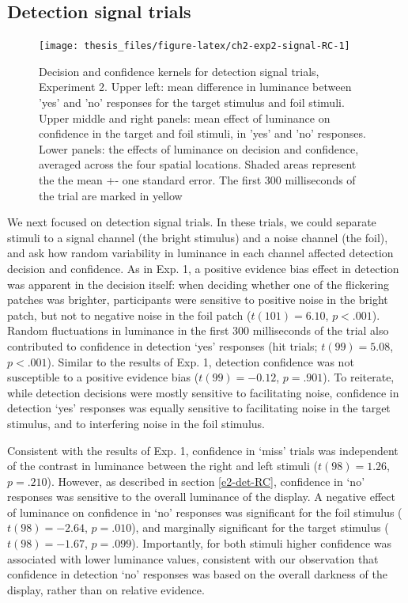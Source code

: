 \documentclass[12pt,twoside]{reedthesis}
\begin{document}
\hypertarget{detection-signal-trials-1}{%
\subsection{Detection signal trials}\label{detection-signal-trials-1}}
\begin{figure}
\texttt{[image: thesis\_files/figure-latex/ch2-exp2-signal-RC-1]} \caption[Decision kernels in detection signal trials, Exp. 2]{Decision and confidence kernels for detection signal trials, Experiment 2. Upper left: mean difference in luminance between 'yes' and 'no' responses for the target stimulus and foil stimuli. Upper middle and right panels: mean effect of luminance on confidence in the target and foil stimuli, in 'yes' and 'no' responses. Lower panels: the effects of luminance on decision and confidence, averaged across the four spatial locations. Shaded areas represent the the mean +- one standard error. The first 300 milliseconds of the trial are marked in yellow}\label{fig:ch2-exp2-signal-RC}
\end{figure}
We next focused on detection signal trials. In these trials, we could separate stimuli to a signal channel (the bright stimulus) and a noise channel (the foil), and ask how random variability in luminance in each channel affected detection decision and confidence. As in Exp. 1, a positive evidence bias effect in detection was apparent in the decision itself: when deciding whether one of the flickering patches was brighter, participants were sensitive to positive noise in the bright patch, but not to negative noise in the foil patch (\(t(101) = 6.10\), \(p < .001\)). Random fluctuations in luminance in the first 300 milliseconds of the trial also contributed to confidence in detection `yes' responses (hit trials; \(t(99) = 5.08\), \(p < .001\)). Similar to the results of Exp. 1, detection confidence was not susceptible to a positive evidence bias (\(t(99) = -0.12\), \(p = .901\)). To reiterate, while detection decisions were mostly sensitive to facilitating noise, confidence in detection `yes' responses was equally sensitive to facilitating noise in the target stimulus, and to interfering noise in the foil stimulus.

Consistent with the results of Exp. 1, confidence in `miss' trials was independent of the contrast in luminance between the right and left stimuli (\(t(98) = 1.26\), \(p = .210\)). However, as described in section \ref{e2-det-RC}, confidence in `no' responses was sensitive to the overall luminance of the display. A negative effect of luminance on confidence in `no' responses was significant for the foil stimulus (\(t(98) = -2.64\), \(p = .010\)), and marginally significant for the target stimulus (\(t(98) = -1.67\), \(p = .099\)). Importantly, for both stimuli higher confidence was associated with lower luminance values, consistent with our observation that confidence in detection `no' responses was based on the overall darkness of the display, rather than on relative evidence.
\end{document}
